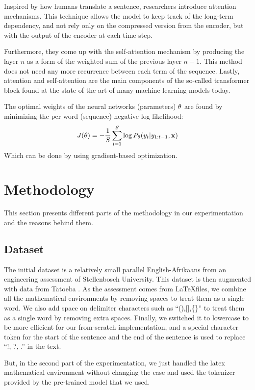Inspired by how humans translate a sentence, researchers introduce attention mechanisms. This technique allows the model to keep track of the long-term dependency, and not rely only on the compressed version from the encoder, but with the output of the encoder at each time step.

Furthermore, they come up with the self-attention mechanism by producing the layer  $n$ as a form of the weighted sum of the previous layer $n-1$. This method does not need any more recurrence between each term of the sequence. Lastly, attention and self-attention are the main components of the so-called transformer block found at the state-of-the-art of many machine learning models today.


The optimal weights of the neural networks (parameters) $\mathbf{\theta}$ are found by minimizing the per-word (sequence) negative log-likelihood:
\begin{equation}
	J(\mathbf{\theta}) = -\frac{1}{S}\sum_{i=1}^{S}\log P_{\mathbf{\theta}}(y_t|y_{1:t-1}, \mathbf{x})
\end{equation}
Which can be done by using gradient-based optimization.

\section{Methodology}\label{mth}
This section presents different parts of the methodology in our experimentation and the reasons behind them.

\subsection{Dataset}
The initial dataset is a relatively small parallel English-Afrikaans from an engineering assessment of Stellenbosch University. This dataset is then augmented with data from Tatoeba \cite{tatoeba}. As the assessment comes from \LaTeX files, we combine all the mathematical environments by removing spaces to treat them as a single word. We also add space on delimiter characters such as ``(),[],\{\}'' to treat them as a single word by removing extra spaces. Finally, we switched it to lowercase to be more efficient for our from-scratch implementation, and a special character token for the start of the sentence and the end of the sentence is used to replace ``!, ?, .'' in the text.


But, in the second part of the experimentation, we just handled the latex mathematical environment without changing the case and used the tokenizer provided by the pre-trained model that we used.

